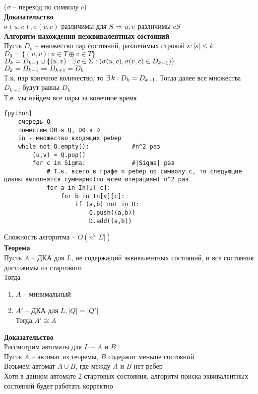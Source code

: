 \documentclass[12pt]{article}
\begin{document}
($\sigma$ -- переход по символу $c$)\\
\textbf{Доказательство}\\
$\sigma(u,c), \sigma(v,c)$ различимы для $S \Rightarrow u,v$ различимы $cS$\\
\textbf{Алгоритм нахождения неэквивалентных состояний}\\
Пусть $D_k$ -- множество пар состояний, различимых строкой $s: |s| \leq k$
$D_0 = \{(u,v): u \in T \oplus v \in T\}$\\
$D_k = D_{k-1} \cup \{(u,v): \exists\, c \in \Sigma: (\sigma(u,c), \sigma(v,c) \in D_{k-1}) \}$\\
$D_k = D_{k-1} \Rightarrow D_{k+1} = D_k$\\
Т.к. пар конечное количество, то $\exists\, k: D_k = D_{k+1}$. Тогда далее все множества $D_{k+i}$ будут равны $D_k$\\
Т.е. мы найдем все пары за конечное время\\
\begin{lstlisting}{python}
    очередь Q
    поместим D0 в Q, D0 в D
    In - множество входящих ребер
    while not Q.empty():            #n^2 раз
        (u,v) = Q.pop()
        for c in Sigma:             #|Sigma| раз
            # Т.к. всего в графе n ребер по символу c, то следующие циклы выполнятся суммарно(по всем итерациям) n^2 раз
            for a in In[u][c]:
                for b in In[v][c]:
                    if (a,b) not in D:
                        Q.push((a,b))
                        D.add((a,b))
\end{lstlisting}
Сложность алгоритма -- $O(n^2|\Sigma|)$\\
\textbf{Теорема}\\
Пусть $A$ -- ДКА для $L$, не содержащий эквивалентных состояний, и все состояния достижимы из стартового\\
Тогда
\begin{enumerate}
    \item $A$ -- минимальный
    \item $A'$ -- ДКА для $L, |Q| = |Q'|$\\
    Тогда $A' \cong A$
\end{enumerate}
\textbf{Доказательство}\\
Рассмотрим автоматы для $L$ -- $A$ и $B$\\
Пусть $A$ -- автомат из теоремы, $B$ содержит меньше состояний\\
Возьмем автомат $A \cup B$, где между $A$ и $B$ нет ребер\\
Хотя в данном автомате 2 стартовых состояния, алгоритм поиска эквивалентных состояний будет работать корректно\\
\end{document}
